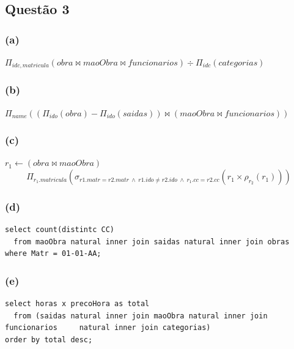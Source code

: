 \documentclass{article}
\begin{document}
\subsection*{Questão 3}
\subsubsection*{(a)}
$\Pi_{idc,matricula}(obra \Join maoObra \Join funcionarios) \div \Pi_{idc}(categorias)$
\subsubsection*{(b)}
$\Pi_{name} ((\Pi_{ido}(obra) - \Pi_{ido}(saidas)) \Join (maoObra \Join funcionarios))$
\subsubsection*{(c)}
$r_1 \leftarrow (obra \Join maoObra)$
\[
  \Pi_{r_1.matricula} (\sigma_{r1.matr = r2.matr \ \wedge \ r1.ido \neq r2.ido \ \wedge \ r_1.cc = r2.cc}(r_1 \times \rho_{r_2}(r_1)))
\]
\subsubsection*{(d)}
\begin{lstlisting}
select count(distintc CC)
  from maoObra natural inner join saidas natural inner join obras
where Matr = 01-01-AA;
\end{lstlisting}
\subsubsection*{(e)}
\begin{lstlisting}
select horas x precoHora as total
  from (saidas natural inner join maoObra natural inner join funcionarios     natural inner join categorias)
order by total desc;
\end{lstlisting}
\end{document}

